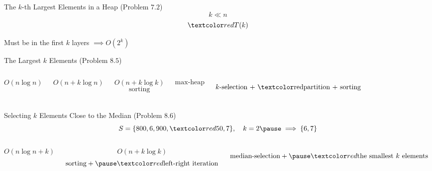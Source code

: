 
\begin{frame}{}
  \begin{exampleblock}{The $k$-th Largest Elements in a Heap (Problem $7.2$)}
    \[
      k \ll n
    \]
    \vspace{-0.60cm}
    \vspace{-0.50cm}
    \[
      \red{T(k)}
    \]
  \end{exampleblock}

  \pause
  \vspace{0.30cm}
  \centerline{Must be in the first $k$ layers \pause $\implies O(2^k)$}
\end{frame}

\begin{frame}{}
  \begin{exampleblock}{The Largest $k$ Elements (Problem $8.5$)}
    \begin{columns}
	\[
	  O(n \log n)
	\]

	\[
	  O(n + k \log n)
	\]

	\[
	  O(n + k \log k)
	\]
	\pause
        \[
	  \text{sorting}
	\]

	\pause
	\[
	  \text{max-heap}
	\]

	\pause
	\[
	  \text{$k$-selection + \red{partition} + sorting}
	\]
    \end{columns}
  \end{exampleblock}
\end{frame}

\begin{frame}{}
  \begin{exampleblock}{Selecting $k$ Elements Close to the Median (Problem $8.6$)}
    \[
      S = \set{800, 6, 900, \red{50}, 7}, \quad k = 2 \pause \implies \set{6,7}
    \]

    \begin{columns}
      \pause
        \[
	  O(n \log n + k)
	\]

	\[
	  O(n + k \log k)
	\]
        \pause
        \[
	  \text{sorting} + \pause \red{\text{left-right iteration}}
	\]

	\pause
	\vspace{-0.80cm}
	\[
	  \text{median-selection} + \pause \red{\text{the smallest $k$ elements}}
	\]
    \end{columns}
  \end{exampleblock}
\end{frame}

